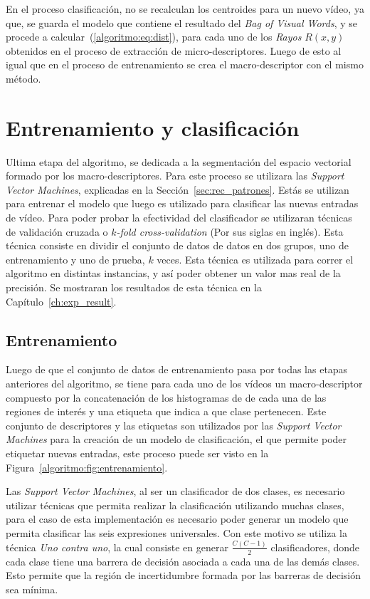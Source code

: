	En el proceso clasificación, no se recalculan los centroides para un nuevo vídeo, ya que, se guarda el modelo que contiene el resultado del \textit{Bag of Visual Words}, y se procede a calcular~(\ref{algoritmo:eq:dist}), para cada uno de los \textit{Rayos} $R(x,y)$ obtenidos en el proceso de extracción de micro-descriptores. Luego de esto al igual que en el proceso de entrenamiento se crea el macro-descriptor con el mismo método.
	
	
\section{Entrenamiento y clasificación}
\label{sec:clasificacion}
Ultima etapa del algoritmo, se dedicada a la segmentación del espacio vectorial formado por los macro-descriptores. Para este proceso se utilizara las \textit{Support Vector Machines}, explicadas en la Sección~\ref{sec:rec_patrones}. Estás se utilizan para entrenar el modelo que luego es utilizado para clasificar las nuevas entradas de vídeo. 
Para poder probar la efectividad del clasificador se utilizaran técnicas de validación cruzada o $k$\textit{-fold cross-validation} (Por sus siglas en inglés). Esta técnica consiste en dividir el conjunto de datos de datos en dos grupos, uno de entrenamiento y uno de prueba, $k$ veces. Esta técnica es utilizada para correr el algoritmo en distintas instancias, y así poder obtener un valor mas real de la precisión. Se mostraran los resultados de esta técnica en la Capítulo~\ref{ch:exp_result}.


	\subsection{Entrenamiento}
	\label{algoritmo:entrenamiento}
		Luego de que el conjunto de datos de entrenamiento pasa por todas las etapas anteriores del algoritmo, se tiene para cada uno de los vídeos un macro-descriptor compuesto por la concatenación de los histogramas de de cada una de las regiones de interés y una etiqueta que indica a que clase pertenecen. Este conjunto de descriptores y las etiquetas son utilizados por las \textit{Support Vector Machines} para la creación de un modelo de clasificación, el que permite poder etiquetar nuevas entradas, este proceso puede ser visto en la Figura~\ref{algoritmo:fig:entrenamiento}.
	
	Las \textit{Support Vector Machines}, al ser un clasificador de dos clases, es necesario utilizar técnicas que permita realizar la clasificación utilizando muchas clases, para el caso de esta implementación es necesario poder generar un modelo que permita clasificar las seis expresiones universales. Con este motivo se utiliza la técnica \textit{Uno contra uno}, la cual consiste en generar $\frac{C(C-1)}{2}$ clasificadores, donde cada clase tiene una barrera de decisión asociada a cada una de las demás clases. Esto permite que la región de incertidumbre formada por las barreras de decisión sea mínima.
		
